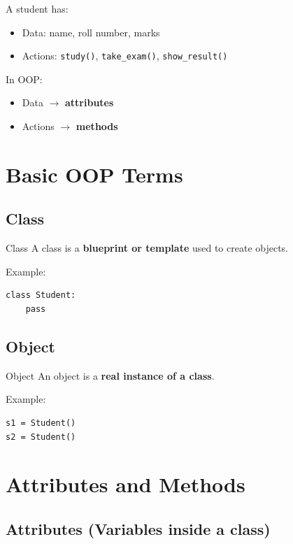 A student has:
\begin{itemize}
    \item Data: name, roll number, marks
    \item Actions: \texttt{study()}, \texttt{take\_exam()}, \texttt{show\_result()}
\end{itemize}

In OOP:
\begin{itemize}
    \item Data $\rightarrow$ \textbf{attributes}
    \item Actions $\rightarrow$ \textbf{methods}
\end{itemize}

\section{Basic OOP Terms}

\subsection{Class}

\begin{definition}{Class}
A class is a \textbf{blueprint or template} used to create objects.
\end{definition}

Example:
\begin{verbatim}
class Student:
    pass
\end{verbatim}

\subsection{Object}

\begin{definition}{Object}
An object is a \textbf{real instance of a class}.
\end{definition}

Example:
\begin{verbatim}
s1 = Student()
s2 = Student()
\end{verbatim}

\section{Attributes and Methods}

\subsection{Attributes (Variables inside a class)}

